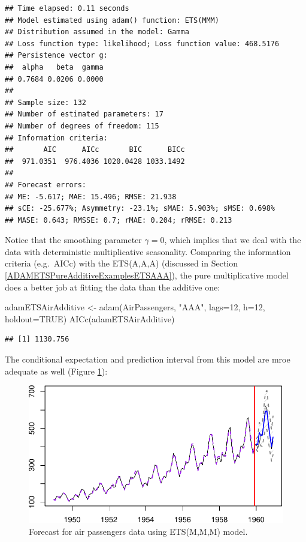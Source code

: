 \documentclass[
]{book}
\newenvironment{Shaded}{\begin{snugshade}}{\end{snugshade}}
\newcommand{\AttributeTok}[1]{\textcolor[rgb]{0.77,0.63,0.00}{#1}}
\newcommand{\ConstantTok}[1]{\textcolor[rgb]{0.00,0.00,0.00}{#1}}
\newcommand{\DecValTok}[1]{\textcolor[rgb]{0.00,0.00,0.81}{#1}}
\newcommand{\FunctionTok}[1]{\textcolor[rgb]{0.00,0.00,0.00}{#1}}
\newcommand{\NormalTok}[1]{#1}
\newcommand{\OtherTok}[1]{\textcolor[rgb]{0.56,0.35,0.01}{#1}}
\newcommand{\StringTok}[1]{\textcolor[rgb]{0.31,0.60,0.02}{#1}}
\theoremstyle{definition}
\theoremstyle{definition}
\theoremstyle{definition}
\theoremstyle{definition}
\theoremstyle{remark}
\begin{document}
\begin{verbatim}
## Time elapsed: 0.11 seconds
## Model estimated using adam() function: ETS(MMM)
## Distribution assumed in the model: Gamma
## Loss function type: likelihood; Loss function value: 468.5176
## Persistence vector g:
##  alpha   beta  gamma 
## 0.7684 0.0206 0.0000 
## 
## Sample size: 132
## Number of estimated parameters: 17
## Number of degrees of freedom: 115
## Information criteria:
##       AIC      AICc       BIC      BICc 
##  971.0351  976.4036 1020.0428 1033.1492 
## 
## Forecast errors:
## ME: -5.617; MAE: 15.496; RMSE: 21.938
## sCE: -25.677%; Asymmetry: -23.1%; sMAE: 5.903%; sMSE: 0.698%
## MASE: 0.643; RMSSE: 0.7; rMAE: 0.204; rRMSE: 0.213
\end{verbatim}

Notice that the smoothing parameter \(\gamma=0\), which implies that we deal with the data with deterministic multiplicative seasonality. Comparing the information criteria (e.g.~AICc) with the ETS(A,A,A) (discussed in Section \ref{ADAMETSPureAdditiveExamplesETSAAA}), the pure multiplicative model does a better job at fitting the data than the additive one:

\begin{Shaded}
\begin{Highlighting}[]
\NormalTok{adamETSAirAdditive }\OtherTok{\textless{}{-}} \FunctionTok{adam}\NormalTok{(AirPassengers, }\StringTok{"AAA"}\NormalTok{, }\AttributeTok{lags=}\DecValTok{12}\NormalTok{,}
                           \AttributeTok{h=}\DecValTok{12}\NormalTok{, }\AttributeTok{holdout=}\ConstantTok{TRUE}\NormalTok{)}
\FunctionTok{AICc}\NormalTok{(adamETSAirAdditive)}
\end{Highlighting}
\end{Shaded}

\begin{verbatim}
## [1] 1130.756
\end{verbatim}

The conditional expectation and prediction interval from this model are mroe adequate as well (Figure \ref{fig:AirPassengersMMMForecast}):

\begin{figure}
\centering
\includegraphics{Svetunkov--2022----ADAM_files/figure-latex/AirPassengersMMMForecast-1.pdf}
\caption{\label{fig:AirPassengersMMMForecast}Forecast for air passengers data using ETS(M,M,M) model.}
\end{figure}
\end{document}
